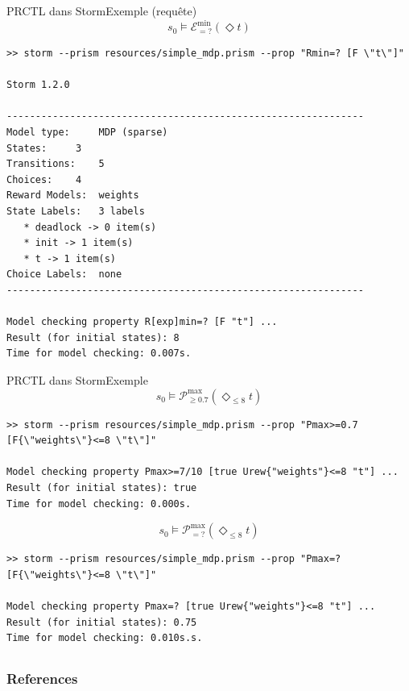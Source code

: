 \documentclass[compress]{beamer}
\begin{document}
\begin{frame}[fragile]{PRCTL dans Storm}{Exemple (requête)}
\vspace{-0.05\linewidth}
  \[
    s_0 \models \mathcal{E}_{=?}^{\min}(\Diamond t)
  \]
  {\tiny
  \begin{verbatim}
>> storm --prism resources/simple_mdp.prism --prop "Rmin=? [F \"t\"]"

Storm 1.2.0

--------------------------------------------------------------
Model type: 	MDP (sparse)
States: 	3
Transitions: 	5
Choices: 	4
Reward Models:  weights
State Labels: 	3 labels
   * deadlock -> 0 item(s)
   * init -> 1 item(s)
   * t -> 1 item(s)
Choice Labels: 	none
--------------------------------------------------------------

Model checking property R[exp]min=? [F "t"] ...
Result (for initial states): 8
Time for model checking: 0.007s.
  \end{verbatim}
  }
\end{frame}

\begin{frame}[fragile]{PRCTL dans Storm}{Exemple}
\vspace{-0.05\linewidth}
  \[
    s_0 \models \mathcal{P}_{\geq 0.7}^{\max}(\Diamond_{\leq 8} t)
  \]
  {\tiny
  \begin{verbatim}
>> storm --prism resources/simple_mdp.prism --prop "Pmax>=0.7 [F{\"weights\"}<=8 \"t\"]"

Model checking property Pmax>=7/10 [true Urew{"weights"}<=8 "t"] ...
Result (for initial states): true
Time for model checking: 0.000s.
  \end{verbatim}
  }
  \[
    s_0 \models \mathcal{P}_{=?}^{\max}(\Diamond_{\leq 8} t)
  \]
  {\tiny
  \begin{verbatim}
>> storm --prism resources/simple_mdp.prism --prop "Pmax=? [F{\"weights\"}<=8 \"t\"]"

Model checking property Pmax=? [true Urew{"weights"}<=8 "t"] ...
Result (for initial states): 0.75
Time for model checking: 0.010s.s.
  \end{verbatim}
  }
\end{frame}

\subsection{}
\begin{frame}[allowframebreaks]
        \frametitle{References}
      \printbibliography
\end{frame}
\end{document}
